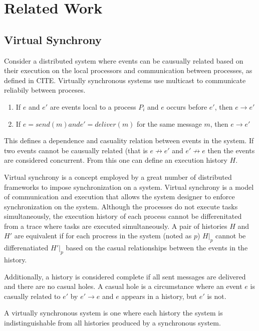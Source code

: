 \chapter{Related Work}

\section{Virtual Synchrony}

Consider a distributed system where events can be causually related based
on their execution on the local processors and communication between
processes, as defined in CITE. Virtually synchronous systems use multicast
to communicate reliabily between proceses.

\begin{enumerate}
    \item If $e$ and $e'$ are events local to a process $P_{i}$ and $e$ occurs before $e'$, then $e \rightarrow e'$
    \item If $e = send(m) and e'=deliver(m)$ for the same message $m$, then $e \rightarrow e'$
\end{enumerate}

This defines a dependence and casuality relation between events in the system.
If two events cannot be causually related (that is $e \not\rightarrow e'$ and
$e' \not\rightarrow e$ then the events are considered concurrent. From this
one can define an execution history $H$.

Virtual synchrony is a concept employed by a great number of distributed
frameworks to impose synchronization on a system. Virtual synchrony is a
model of communication and execution that allows the system designer to
enforce synchronization on the system. Although the processes do not
execute tasks simultaneously, the execution history of each process cannot
be differenitated from a trace where tasks are executed simultaneously. A
pair of histories $H$ and $H'$ are equivalent if for each procress in the
system (noted as $p$) $H|_{p}$ cannot be differenatiated $H'|_{p}$ based
on the casual relationships between the events in the history.

Additionally, a history is considered complete if all sent messages are
delivered and there are no casual holes. A casual hole is a circumstance
where an event $e$ is casually related to $e'$ by $e' \rightarrow e$ and
$e$ appears in a history, but $e'$ is not. 

A virtually synchronous system is one where each history the system is
indistinguishable from all histories produced by a synchronous system.

